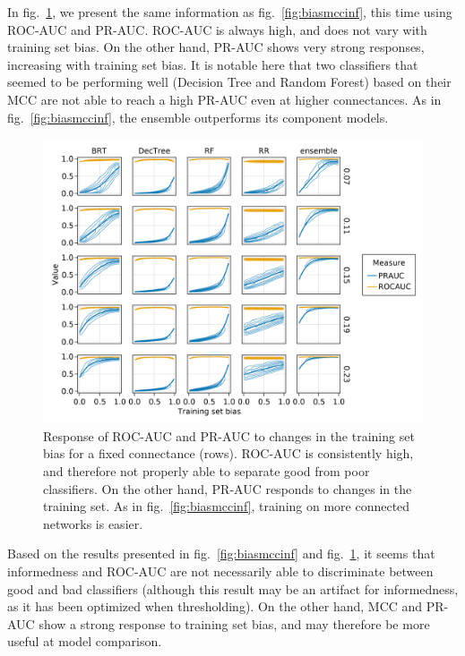 \documentclass[11pt]{article}
\makeatletter
\def\maxwidth{\ifdim\Gin@nat@width>\linewidth\linewidth
\else\Gin@nat@width\fi}
\let\Oldincludegraphics\includegraphics
\renewcommand{\includegraphics}[1]{\Oldincludegraphics[width=\maxwidth]{#1}}
\makeatother
\begin{document}
In fig.~\ref{fig:biasrocpr}, we present the same information as
fig.~\ref{fig:biasmccinf}, this time using ROC-AUC and PR-AUC. ROC-AUC
is always high, and does not vary with training set bias. On the other
hand, PR-AUC shows very strong responses, increasing with training set
bias. It is notable here that two classifiers that seemed to be
performing well (Decision Tree and Random Forest) based on their MCC are
not able to reach a high PR-AUC even at higher connectances. As in
fig.~\ref{fig:biasmccinf}, the ensemble outperforms its component
models.

\begin{figure}
\hypertarget{fig:biasrocpr}{%
\centering
\includegraphics{figures/bias_roc_pr.png}
\caption{Response of ROC-AUC and PR-AUC to changes in the training set
bias for a fixed connectance (rows). ROC-AUC is consistently high, and
therefore not properly able to separate good from poor classifiers. On
the other hand, PR-AUC responds to changes in the training set. As in
fig.~\ref{fig:biasmccinf}, training on more connected networks is
easier.}\label{fig:biasrocpr}
}
\end{figure}

Based on the results presented in fig.~\ref{fig:biasmccinf} and
fig.~\ref{fig:biasrocpr}, it seems that informedness and ROC-AUC are not
necessarily able to discriminate between good and bad classifiers
(although this result may be an artifact for informedness, as it has
been optimized when thresholding). On the other hand, MCC and PR-AUC
show a strong response to training set bias, and may therefore be more
useful at model comparison.
\end{document}
